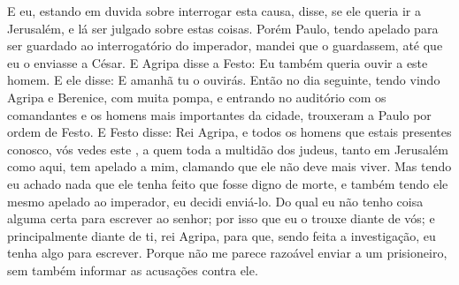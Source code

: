 {  E eu, estando em duvida sobre
{} interrogar esta causa, disse,
{} se ele queria ir a Jerusalém, e lá ser julgado sobre estas coisas.
  Porém Paulo, tendo apelado para ser guardado ao interrogatório do imperador, mandei que o guardassem, até que eu o enviasse a César.
  E Agripa disse a Festo: Eu também queria ouvir a este homem. E ele disse: E amanhã tu o ouvirás.
  Então no dia seguinte, tendo vindo Agripa e Berenice, com muita pompa, e entrando no auditório com os comandantes e os homens mais importantes da cidade, trouxeram a Paulo por ordem de Festo.
  E Festo disse: Rei Agripa, e todos os homens que estais presentes
{} conosco, vós vedes este
{},  a quem toda a multidão dos judeus, tanto em Jerusalém como aqui, tem apelado a mim, clamando que ele não deve mais viver.
  Mas tendo eu achado nada que ele tenha feito que fosse digno de morte, e também tendo ele mesmo apelado ao imperador, eu decidi enviá-lo.
  Do qual eu não tenho coisa alguma certa para escrever ao
{} senhor; por isso que eu o trouxe diante de vós; e principalmente diante de ti, rei Agripa, para que, sendo feita a investigação, eu tenha algo para escrever.
  Porque não me parece razoável enviar a um prisioneiro, sem também informar as acusações contra ele.
\par }

